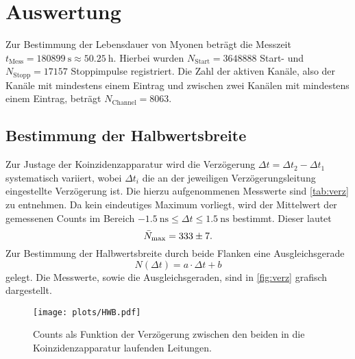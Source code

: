 \section{Auswertung}

Zur Bestimmung der Lebensdauer von Myonen beträgt die Messzeit $ t_\mathrm{Mess} = \SI{180899}{\second} \approx \SI{50.25}{\hour}$. Hierbei wurden $N_\mathrm{Start} = \num{3648888}$ Start- und $N_\mathrm{Stopp} = \num{17157}$ Stoppimpulse registriert. Die Zahl der aktiven Kanäle, also der Kanäle mit mindestens einem Eintrag und zwischen zwei Kanälen mit mindestens einem Eintrag, beträgt $N_{\mathrm{Channel}} = \num{8063}$.

\subsection{Bestimmung der Halbwertsbreite}
Zur Justage der Koinzidenzapparatur wird die Verzögerung $\Delta t = \Delta t_2 - \Delta t_1$ systematisch variiert, wobei $\Delta t_i$ die an der jeweiligen Verzögerungsleitung eingestellte Verzögerung ist. Die hierzu aufgenommenen Messwerte sind \autoref{tab:verz} zu entnehmen.
Da kein eindeutiges Maximum vorliegt, wird der Mittelwert der gemessenen Counts im Bereich $\SI{-1.5}{\ns} \leq \Delta t \leq \SI{1.5}{\ns}$ bestimmt. Dieser lautet
\begin{equation*}
  \bar{N}_\mathrm{max} = \num{333 \pm 7}.
\end{equation*}
Zur Bestimmung der Halbwertsbreite durch beide Flanken eine Ausgleichsgerade
\begin{equation*}
  N(\Delta t) = a \cdot \Delta t + b
\end{equation*}
gelegt. Die Messwerte, sowie die Ausgleichsgeraden, sind in \autoref{fig:verz} grafisch dargestellt.

\begin{figure}[H]
  \centering
  \texttt{[image: plots/HWB.pdf]}
  \caption{Counts als Funktion der Verzögerung zwischen den beiden in die Koinzidenzapparatur laufenden Leitungen.}
  \label{fig:verz}
\end{figure}

